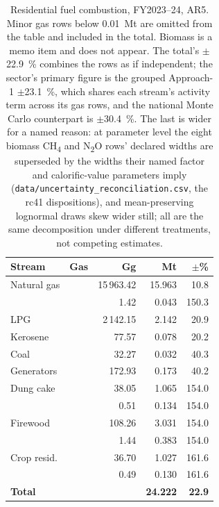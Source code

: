 \begin{table}[htbp]
\centering
\footnotesize
\begin{tabular}{@{}llrrr@{}}
\toprule
\textbf{Stream} & \textbf{Gas} & \textbf{Gg} & \textbf{Mt \COe{}} & \textbf{$\pm$\%} \\
\midrule
Natural gas & \COtwo{}  & 15\,963.42 & 15.963 &  10.8 \\
            & \CHfour{} &      1.42 &  0.043 & 150.3 \\
LPG         & \COtwo{}  &  2\,142.15 &  2.142 &  20.9 \\
Kerosene    & \COtwo{}  &      77.57 &  0.078 &  20.2 \\
Coal        & \COtwo{}  &      32.27 &  0.032 &  40.3 \\
Generators  & \COtwo{}  &     172.93 &  0.173 &  40.2 \\
Dung cake   & \CHfour{} &      38.05 &  1.065 & 154.0 \\
            & \NtwoO{}  &       0.51 &  0.134 & 154.0 \\
Firewood    & \CHfour{} &     108.26 &  3.031 & 154.0 \\
            & \NtwoO{}  &       1.44 &  0.383 & 154.0 \\
Crop resid. & \CHfour{} &      36.70 &  1.027 & 161.6 \\
            & \NtwoO{}  &       0.49 &  0.130 & 161.6 \\
\midrule
\textbf{Total} & & & \textbf{24.222} & \textbf{22.9} \\
\bottomrule
\end{tabular}
\caption{Residential fuel combustion, FY2023--24, AR5. Minor gas rows below
\SI{0.01}{\mega\tonne} are omitted from the table and included in the total. Biomass \COtwo{}
is a memo item and does not appear. The total's $\pm$\SI{22.9}{\percent} combines the rows
as if independent; the sector's primary figure is the grouped Approach-1
$\pm$\SI{23.1}{\percent}, which shares each stream's activity term across its gas rows, and
the national Monte Carlo counterpart is $\pm$\SI{30.4}{\percent}. The last is wider for a
named reason: at parameter level the eight biomass CH\textsubscript{4} and
N\textsubscript{2}O rows' declared widths are superseded by the widths their named factor
and calorific-value parameters imply (\texttt{data/uncertainty\_reconciliation.csv}, the
rc41 dispositions), and mean-preserving lognormal draws skew wider still; all are the same
decomposition under different treatments, not competing estimates.}
\label{tab:results}
\end{table}

